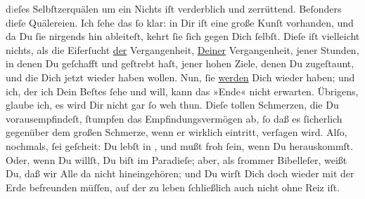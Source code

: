                   d\textcolor{gray}{i}eſes Selbſtzerquälen um ein Nichts iſt verderblich und
               zerrüttend. Beſonders dieſe Quälereien. Ich{ }ſehe das{ }ſo klar: in Dir iſt eine große
               Kunſt vorhanden, und da Du{ }ſie nirgends hin ableiteſt, kehrt{ }ſie{ }ſich gegen Dich{ }ſelbſt. Dieſe \label{K_L02649-2v}\label{K_L02649-2}
               iſt vielleicht nichts, als die Eiferſucht \uline{der}
               Vergangenheit, \uline{Deiner} Vergangenheit, jener Stunden,
               in denen Du geſchafft und geſtrebt haſt, jener hohen Ziele, denen Du zugeſtaunt, und
               die Dich jetzt wieder haben wollen. Nun,{ }ſie \uline{werden}
               Dich wieder haben; und ich, der ich Dein Beſtes{ }ſehe und will, kann das »Ende« nicht
               erwarten. Übrigens, glaube ich, es wird Dir nicht gar{ }ſo weh thun. Dieſe tollen
               Schmerzen, die Du vorausempfindeſt, {\pb}ſtumpfen das
               Empfindungsvermögen ab,{ }ſo daß es{ }ſicherlich gegenüber dem großen Schmerze, wenn er
               wirklich eintritt, verſagen wird. Alſo, nochmals,{ }ſei geſcheit: Du lebſt in \label{K_L02649-3v}\label{K_L02649-3},
               und mußt froh{ }ſein, wenn Du herauskommſt. Oder, wenn Du willſt, Du biſt im Paradieſe;
               aber, als{ }ſrommer Bibelleſer,  weißt Du, daß wir Alle da nicht hineingehören; und Du wirſt Dich doch wieder
               mit der Erde befreunden müſſen, auf der zu leben{ }ſchließlich auch nicht ohne Reiz
               iſt.\pend
           
